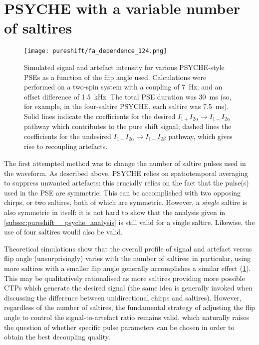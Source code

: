 \section{PSYCHE with a variable number of saltires}
\label{sec:pureshift__nsaltire}

\begin{figure}[htb]
    \centering
    \texttt{[image: pureshift/fa\_dependence\_124.png]}
    \caption[Signal and artefact intensity with 1-, 2-, and 4-saltire PSYCHE]{Simulated signal and artefact intensity for various PSYCHE-style PSEs as a function of the flip angle used.
    Calculations were performed on a two-spin system with a coupling of \SI{7}{\Hz}, and an offset difference of \SI{1.5}{\kHz}.
    The total PSE duration was \SI{30}{\ms} (so, for example, in the four-saltire PSYCHE, each saltire was \SI{7.5}{\ms}).
    Solid lines indicate the coefficients for the desired $I_{1+}I_{2\alpha} \to I_{1-}I_{2\alpha}$ pathway which contributes to the pure shift signal; dashed lines the coefficients for the undesired $I_{1+}I_{2\alpha} \to I_{1-}I_{2\beta}$ pathway, which gives rise to recoupling artefacts.
}
    \label{fig:fa_dependence_124}
\end{figure}

The first attempted method was to change the number of saltire pulses used in the waveform.
As described above, PSYCHE relies on spatiotemporal averaging to suppress unwanted artefacts: this crucially relies on the fact that the pulse(s) used in the PSE are symmetric.
This can be accomplished with two opposing chirps, or two saltires, both of which are symmetric.
However, a \textit{single} saltire is also symmetric in itself: it is not hard to show that the analysis given in \cref{subsec:pureshift__psyche_analysis} is still valid for a single saltire.
Likewise, the use of four saltires would also be valid.

Theoretical simulations show that the overall profile of signal and artefact versus flip angle (unsurprisingly) varies with the number of saltires: in particular, using more saltires with a smaller flip angle generally accomplishes a similar effect (\cref{fig:fa_dependence_124}).
This may be qualitatively rationalised as more saltires providing more possible CTPs which generate the desired signal (the same idea is generally invoked when discussing the difference between unidirectional chirps and saltires\autocite{Foroozandeh2018CEJ}).
However, regardless of the number of saltires, the fundamental strategy of adjusting the flip angle to control the signal-to-artefact ratio remains valid, which naturally raises the question of whether specific pulse parameters can be chosen in order to obtain the best decoupling quality.

